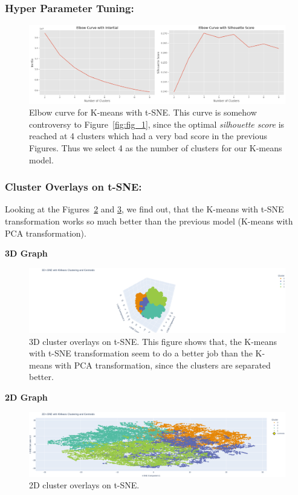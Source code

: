 \documentclass[a4paper,12pt]{article}
\begin{document}
\subsubsection{Hyper Parameter Tuning:}
\begin{figure}[H]
    \centering
    \includegraphics[width=1\textwidth]{./images/elbow_kmeans_tsne.png}
    \caption{Elbow curve for K-means with t-SNE. This curve is somehow controversy to Figure~\ref{fig:fig_1}, 
    since the optimal \textit{silhouette score} is reached at 4 clusters which had a very bad score in the previous Figures. Thus we select 4 as the number of clusters for our K-means model.}
    \label{fig:fig_4}
\end{figure}

\subsubsection{Cluster Overlays on t-SNE:}
Looking at the Figures~\ref{fig:fig_5} and \ref{fig:fig_6}, we find out, that the K-means with t-SNE transformation works so much better than the previous model (K-means with PCA transformation). \\

\newpage

\noindent\textbf{3D Graph}
\begin{figure}[H]
    \centering
    \includegraphics[width=1\textwidth]{./images/3d_tsne_kmeans.png}
    \caption{3D cluster overlays on t-SNE. This figure shows that, the K-means with t-SNE transformation seem to do a better job than the K-means with PCA transformation, since the clusters are separated better.}
    \label{fig:fig_5}
\end{figure}


\noindent\textbf{2D Graph}
\begin{figure}[H]
    \centering
    \includegraphics[width=1\textwidth]{./images/2d_tsne_kmeans.png}
    \caption{2D cluster overlays on t-SNE.}
    \label{fig:fig_6}
\end{figure}
\end{document}

